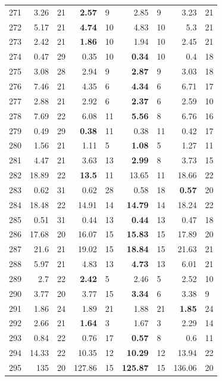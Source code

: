 \begin{longtable}{lr@{\hskip 4pt}l@{\hskip 12pt}r@{\hskip 4pt}l@{\hskip 12pt}r@{\hskip 4pt}l@{\hskip 12pt}r@{\hskip 4pt}l@{\hskip 12pt}}
271 & 3.26 & 21 & \textbf{2.57} & 9 & 2.85 & 9 & 3.23 & 21 \\
272 & 5.17 & 21 & \textbf{4.74} & 10 & 4.83 & 10 & 5.3 & 21 \\
273 & 2.42 & 21 & \textbf{1.86} & 10 & 1.94 & 10 & 2.45 & 21 \\
274 & 0.47 & 29 & 0.35 & 10 & \textbf{0.34} & 10 & 0.4 & 18 \\
275 & 3.08 & 28 & 2.94 & 9 & \textbf{2.87} & 9 & 3.03 & 18 \\
276 & 7.46 & 21 & 4.35 & 6 & \textbf{4.34} & 6 & 6.71 & 17 \\
277 & 2.88 & 21 & 2.92 & 6 & \textbf{2.37} & 6 & 2.59 & 10 \\
278 & 7.69 & 22 & 6.08 & 11 & \textbf{5.56} & 8 & 6.76 & 16 \\
279 & 0.49 & 29 & \textbf{0.38} & 11 & 0.38 & 11 & 0.42 & 17 \\
280 & 1.56 & 21 & 1.11 & 5 & \textbf{1.08} & 5 & 1.27 & 11 \\
281 & 4.47 & 21 & 3.63 & 13 & \textbf{2.99} & 8 & 3.73 & 15 \\
282 & 18.89 & 22 & \textbf{13.5} & 11 & 13.65 & 11 & 18.66 & 22 \\
283 & 0.62 & 31 & 0.62 & 28 & 0.58 & 18 & \textbf{0.57} & 20 \\
284 & 18.48 & 22 & 14.91 & 14 & \textbf{14.79} & 14 & 18.24 & 22 \\
285 & 0.51 & 31 & 0.44 & 13 & \textbf{0.44} & 13 & 0.47 & 18 \\
286 & 17.68 & 20 & 16.07 & 15 & \textbf{15.83} & 15 & 17.89 & 20 \\
287 & 21.6 & 21 & 19.02 & 15 & \textbf{18.84} & 15 & 21.63 & 21 \\
288 & 5.97 & 21 & 4.83 & 13 & \textbf{4.73} & 13 & 6.01 & 21 \\
289 & 2.7 & 22 & \textbf{2.42} & 5 & 2.46 & 5 & 2.52 & 10 \\
290 & 3.77 & 20 & 3.77 & 15 & \textbf{3.34} & 6 & 3.38 & 9 \\
291 & 1.86 & 24 & 1.89 & 21 & 1.88 & 21 & \textbf{1.85} & 24 \\
292 & 2.66 & 21 & \textbf{1.64} & 3 & 1.67 & 3 & 2.29 & 14 \\
293 & 0.84 & 22 & 0.76 & 17 & \textbf{0.57} & 8 & 0.6 & 11 \\
294 & 14.33 & 22 & 10.35 & 12 & \textbf{10.29} & 12 & 13.94 & 22 \\
295 & 135 & 20 & 127.86 & 15 & \textbf{125.87} & 15 & 136.06 & 20 \\

\end{longtable}
